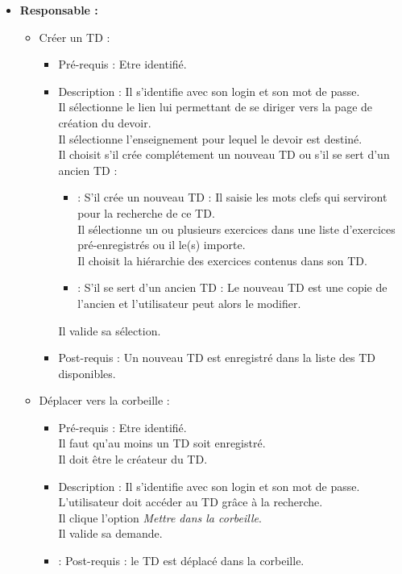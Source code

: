 	\begin{itemize}
	\item {\bf Responsable :}\\
		\begin{itemize}
		\item Cr{\'e}er un TD :
			\begin{itemize}
			\item Pr{\'e}-requis : Etre identifi{\'e}.
			\item Description : Il s'identifie avec son login et son mot de passe.\\
			Il s{\'e}lectionne le lien lui permettant de se diriger vers la page de cr{\'e}ation du devoir.\\
			Il s{\'e}lectionne l'enseignement pour lequel le devoir est destin{\'e}.\\
			Il choisit s'il cr{\'e}e compl{\'e}tement un nouveau TD ou s'il se sert d'un ancien TD :
			\begin{itemize}
				\item : S'il cr{\'e}e un nouveau TD : Il saisie les mots clefs qui serviront pour la recherche de ce TD.\\
				Il s{\'e}lectionne un ou plusieurs exercices dans une liste d'exercices pr{\'e}-enregistr{\'e}s ou il le(s) importe.\\
				Il choisit la hi{\'e}rarchie des exercices contenus dans son TD.
				\item : S'il se sert d'un ancien TD : Le nouveau TD est une copie de l'ancien et l'utilisateur peut alors le modifier.
			\end{itemize}
			Il valide sa s{\'e}lection.
			\item Post-requis : Un nouveau TD est enregistr{\'e} dans la liste des TD disponibles.\\
			\end{itemize}

		\item D{\'e}placer vers la corbeille :
			\begin{itemize}
			\item Pr{\'e}-requis : Etre identifi{\'e}.\\
			Il faut qu'au moins un TD soit enregistr{\'e}.\\
			Il doit {\^e}tre le cr{\'e}ateur du TD.
			\item Description : Il s'identifie avec son login et son mot de passe.\\
			L'utilisateur doit acc{\'e}der au TD gr{\^a}ce {\`a} la recherche.\\
			Il clique l'option {\it Mettre dans la corbeille}.\\
			Il valide sa demande.
			\item : Post-requis : le TD est d{\'e}plac{\'e} dans la corbeille.\\
			\end{itemize}

		\end{itemize}
	\end{itemize}

